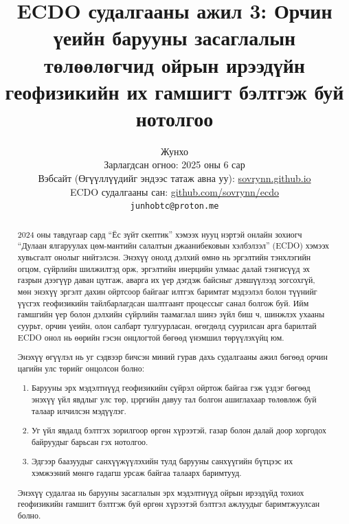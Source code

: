 \documentclass[10pt,twocolumn,letterpaper]{article}
\begin{document}
\title{ECDO судалгааны ажил 3: Орчин үеийн барууны засаглалын төлөөлөгчид ойрын ирээдүйн геофизикийн их гамшигт бэлтгэж буй нотолгоо}

\author{Жунхо\\
Зарлагдсан огноо: 2025 оны 6 сар\\
Вэбсайт (Өгүүллүүдийг эндээс татаж авна уу): \href{https://sovrynn.github.io}{sovrynn.github.io}\\
ECDO судалгааны сан: \href{https://github.com/sovrynn/ecdo}{github.com/sovrynn/ecdo}\\
{\tt\small junhobtc@proton.me}
}

\maketitle

\begin{abstract}

\begin{flushleft}
2024 оны тавдугаар сард “Ёс зүйт скептик” \cite{0} хэмээх нууц нэртэй онлайн зохиогч “Дулаан ялгаруулах цөм-мантийн салалтын джаанибековын хэлбэлзэл” (ECDO)\cite{1} хэмээх хувьсгалт онолыг нийтэлсэн. Энэхүү онолд дэлхий өмнө нь эргэлтийн тэнхлэгийн огцом, сүйрлийн шилжилтэд орж, эргэлтийн инерцийн улмаас далай тэнгисүүд эх газрын дээгүүр даван цутгаж, аварга их үер дэгдэж байсныг дэвшүүлээд зогсохгүй, мөн энэхүү эргэлт дахин ойртсоор байгааг илтгэх баримтат мэдээлэл болон түүнийг үүсгэх геофизикийн тайлбарлагдсан шалтгаант процессыг санал болгож буй. Ийм гамшгийн үер болон дэлхийн сүйрлийн таамаглал шинэ зүйл биш ч, шинжлэх ухааны суурьт, орчин үеийн, олон салбарт тулгуурласан, өгөгдөлд суурилсан арга барилтай ECDO онол нь өөрийн гэсэн онцлогтой бөгөөд үнэмшил төрүүлэхүйц юм.

Энэхүү өгүүлэл нь уг сэдвээр бичсэн миний гурав дахь судалгааны ажил \cite{2,3} бөгөөд орчин цагийн улс төрийг онцолсон болно:
\begin{enumerate}
    \item Барууны эрх мэдэлтнүүд геофизикийн сүйрэл ойртож байгаа гэж үздэг бөгөөд энэхүү үйл явдлыг улс төр, цэргийн давуу тал болгон ашиглахаар төлөвлөж буй талаар илчилсэн мэдүүлэг.
    \item Уг үйл явдалд бэлтгэх зорилгоор өргөн хүрээтэй, газар болон далай доор хоргодох байруудыг барьсан гэх нотолгоо.
    \item Эдгээр баазуудыг санхүүжүүлэхийн тулд барууны санхүүгийн бүтцээс их хэмжээний мөнгө гадагш урсаж байгаа талаарх баримтууд.
\end{enumerate}
\end{flushleft}
Энэхүү судалгаа нь барууны засаглалын эрх мэдэлтнүүд ойрын ирээдүйд тохиох геофизикийн гамшигт бэлтгэж буй өргөн хүрээтэй бэлтгэл ажлуудыг баримтжуулсан болно.
\end{abstract}
\end{document}
